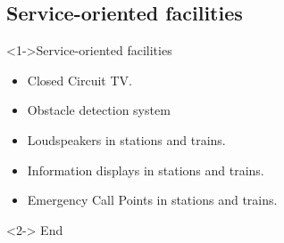 \subsection{Service-oriented facilities}
\frame
{  
   
      \begin{block}<1->{Service-oriented facilities}
      \begin{itemize}
       \item Closed Circuit TV.
\item Obstacle detection system
\item Loudspeakers in stations and trains.
\item Information displays in stations and trains.
\item Emergency Call Points in stations and trains.
\end{itemize}



   \end{block}
   
    \begin{block}<2->{}
   End
   \end{block}
}


